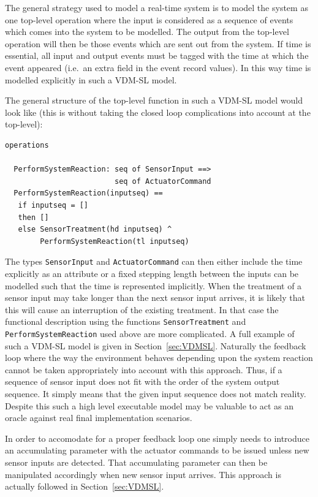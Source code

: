 \documentclass{overturerepchap}
\begin{document}
The general strategy used to model a real-time system is to model the
system as one top-level operation where the input is considered as a
sequence of events which comes into the system to be modelled. The
output from the top-level operation will then be those events which
are sent out from the system. If time is essential, all input and
output events must be tagged with the time at which the event appeared
(i.e.\ an extra field in the event record values). In this way time is
modelled explicitly in such a VDM-SL model.

The general structure of the top-level function in such a VDM-SL model
would look like (this is without taking the closed loop complications
into account at the top-level):

\begin{lstlisting}
operations

  PerformSystemReaction: seq of SensorInput ==> 
                         seq of ActuatorCommand
  PerformSystemReaction(inputseq) ==
   if inputseq = []
   then []
   else SensorTreatment(hd inputseq) ^ 
        PerformSystemReaction(tl inputseq)
\end{lstlisting}

The types \texttt{SensorInput} and \texttt{ActuatorCommand} can then
either include the time explicitly as an attribute or a fixed
stepping length between the inputs can be modelled such that the time
is represented implicitly. When the treatment of a sensor input may
take longer than the next sensor input arrives, it is likely that this
will cause an interruption of the existing treatment. In that case the
functional description using the functions \texttt{SensorTreatment} and
\texttt{Perform\-System\-Reaction} used above are more complicated. A full example
of such a VDM-SL model is given in Section~\ref{sec:VDMSL}. Naturally
the feedback loop where the way the environment behaves depending upon
the system reaction cannot be taken appropriately into account with
this approach. Thus, if a sequence of sensor input does not fit with
the order of the system output sequence. It simply means that the
given input sequence does not match reality. Despite this such a high
level executable model may be valuable to act as an oracle against
real final implementation scenarios.

In order to accomodate for a proper feedback loop one simply needs to
introduce an accumulating parameter with the actuator commands to be 
issued unless new sensor inputs are detected. That accumulating
parameter can then be manipulated accordingly when new sensor
input arrives. This approach is actually followed in 
Section~\ref{sec:VDMSL}.
\end{document}
